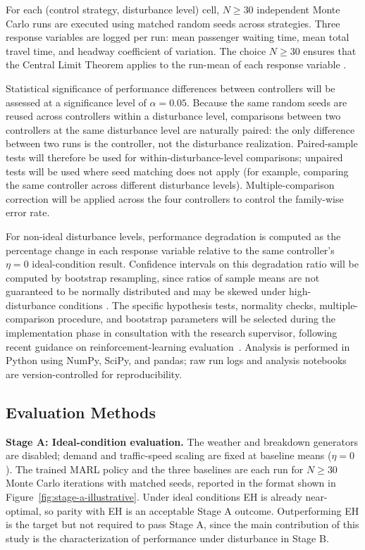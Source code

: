 For each (control strategy, disturbance level) cell, $N \geq 30$ independent Monte Carlo runs are executed using matched random seeds across strategies. Three response variables are logged per run: mean passenger waiting time, mean total travel time, and headway coefficient of variation. The choice $N \geq 30$ ensures that the Central Limit Theorem applies to the run-mean of each response variable \cite{Wasserman2004}.

Statistical significance of performance differences between controllers will be assessed at a significance level of $\alpha = 0.05$. Because the same random seeds are reused across controllers within a disturbance level, comparisons between two controllers at the same disturbance level are naturally paired: the only difference between two runs is the controller, not the disturbance realization. Paired-sample tests will therefore be used for within-disturbance-level comparisons; unpaired tests will be used where seed matching does not apply (for example, comparing the same controller across different disturbance levels). Multiple-comparison correction will be applied across the four controllers to control the family-wise error rate.

For non-ideal disturbance levels, performance degradation is computed as the percentage change in each response variable relative to the same controller's $\eta = 0$ ideal-condition result. Confidence intervals on this degradation ratio will be computed by bootstrap resampling, since ratios of sample means are not guaranteed to be normally distributed and may be skewed under high-disturbance conditions \cite{EfronTibshirani1993}. The specific hypothesis tests, normality checks, multiple-comparison procedure, and bootstrap parameters will be selected during the implementation phase in consultation with the research supervisor, following recent guidance on reinforcement-learning evaluation~\cite{Henderson2018Matters,Agarwal2021Precipice}. Analysis is performed in Python using NumPy, SciPy, and pandas; raw run logs and analysis notebooks are version-controlled for reproducibility.

\subsection{Evaluation Methods}
\label{subsec:evaluation}



\textbf{Stage A: Ideal-condition evaluation.} The weather and breakdown generators are disabled; demand and traffic-speed scaling are fixed at baseline means ($\eta = 0$). The trained MARL policy and the three baselines are each run for $N \geq 30$ Monte Carlo iterations with matched seeds, reported in the format shown in Figure~\ref{fig:stage-a-illustrative}. Under ideal conditions EH is already near-optimal, so parity with EH is an acceptable Stage A outcome. Outperforming EH is the target but not required to pass Stage A, since the main contribution of this study is the characterization of performance under disturbance in Stage B.

